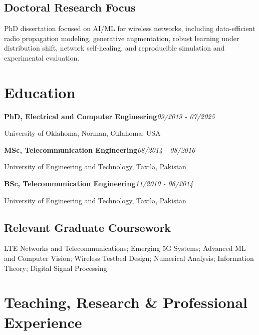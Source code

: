 \documentclass[10pt,letterpaper]{extarticle}
\newcommand{\entry}[2]{\Needspace{4\baselineskip}\textbf{#1}\hfill\textit{#2}\par}
\begin{document}
\subsection{Doctoral Research Focus}
PhD dissertation focused on AI/ML for wireless networks, including data-efficient radio propagation modeling, generative augmentation, robust learning under distribution shift, network self-healing, and reproducible simulation and experimental evaluation.\par
{}
\section{Education}
\entry{PhD, Electrical and Computer Engineering}{09/2019 - 07/2025}
University of Oklahoma, Norman, Oklahoma, USA\par
\entry{MSc, Telecommunication Engineering}{08/2014 - 08/2016}
University of Engineering and Technology, Taxila, Pakistan\par
\entry{BSc, Telecommunication Engineering}{11/2010 - 06/2014}
University of Engineering and Technology, Taxila, Pakistan\par
{}
\subsection{Relevant Graduate Coursework}
LTE Networks and Telecommunications; Emerging 5G Systems; Advanced ML and Computer Vision; Wireless Testbed Design; Numerical Analysis; Information Theory; Digital Signal Processing\par
{}
\section{Teaching, Research \& Professional Experience}
\end{document}
